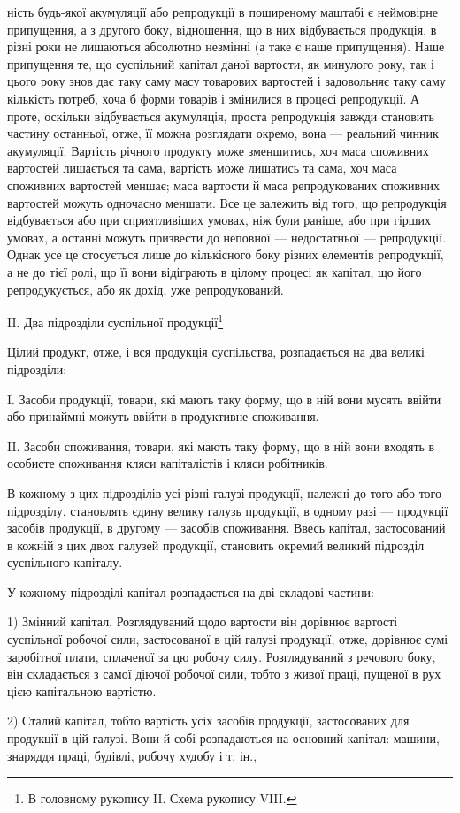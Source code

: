 ність будь-якої акумуляції або репродукції в поширеному маштабі є
неймовірне припущення, а з другого боку, відношення, що в них відбувається
продукція, в різні роки не лишаються абсолютно незмінні (а таке
є наше припущення). Наше припущення те, що суспільний капітал даної
вартости, як минулого року, так і цього року знов дає таку саму масу товарових вартостей і
задовольняє таку саму кількість потреб, хоча б форми товарів і змінилися в процесі репродукції. А
проте, оскільки відбувається акумуляція, проста репродукція завжди становить частину останньої,
отже, її можна розглядати окремо, вона — реальний чинник акумуляції. Вартість річного продукту може
зменшитись, хоч маса споживних вартостей лишається та сама, вартість може лишатись та сама, хоч маса
споживних вартостей меншає; маса вартости й маса репродукованих
споживних вартостей можуть одночасно меншати. Все це залежить
від того, що репродукція відбувається або при сприятливіших умовах,
ніж були раніше, або при гірших умовах, а останні можуть призвести до
неповної — недостатньої — репродукції. Однак усе це стосується лише до
кількісного боку різних елементів репродукції, а не до тієї ролі, що її
вони відіграють в цілому процесі як капітал, що його репродукується,
або як дохід, уже репродукований.

II. Два підрозділи суспільної продукції\footnote{
В головному рукопису II. Схема рукопису VIII.
}

Цілий продукт, отже, і вся продукція суспільства, розпадається на
два великі підрозділи:

I. Засоби продукції, товари, які мають таку форму, що в ній
вони мусять ввійти або принаймні можуть ввійти в продуктивне споживання.

II. Засоби споживання, товари, які мають таку форму, що в
ній вони входять в особисте споживання кляси капіталістів і кляси робітників.

В кожному з цих підрозділів усі різні галузі продукції, належні до
того або того підрозділу, становлять єдину велику галузь продукції,
в одному разі — продукції засобів продукції, в другому — засобів споживання.
Ввесь капітал, застосований в кожній з цих двох галузей продукції,
становить окремий великий підрозділ суспільного капіталу.

У кожному підрозділі капітал розпадається на дві складові частини:

1) Змінний капітал. Розглядуваний щодо вартости він дорівнює
вартості суспільної робочої сили, застосованої в цій галузі продукції,
отже, дорівнює сумі заробітної плати, сплаченої за цю робочу силу.
Розглядуваний з речового боку, він складається з самої діючої робочої
сили, тобто з живої праці, пущеної в рух цією капітальною вартістю.

2) Сталий капітал, тобто вартість усіх засобів продукції, застосованих
для продукції в цій галузі. Вони й собі розпадаються на основний
капітал: машини, знаряддя праці, будівлі, робочу худобу і т. ін.,